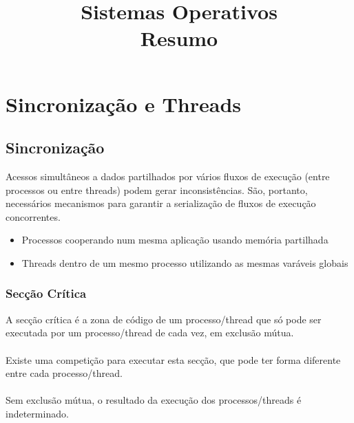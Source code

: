 \documentclass[10pt,a4paper]{report}
\title{\LARGE{Sistemas Operativos} \\ \vspace{0.5cm} \normalsize{Resumo}}
\date{}
\begin{document}
\maketitle
\tableofcontents

\chapter{Sincronização e Threads}
\section{Sincronização}
Acessos simultâneos a dados partilhados por vários fluxos de execução (entre processos ou entre threads) podem gerar
inconsistências. São, portanto, necessários mecanismos para garantir a serialização de fluxos de execução concorrentes.
\begin{itemize}
\item Processos cooperando num mesma aplicação usando memória partilhada
\item Threads dentro de um mesmo processo utilizando as mesmas varáveis globais
\end{itemize}
\subsection{Secção Crítica}
A secção crítica é a zona de código de um processo/thread que só pode ser executada por um processo/thread de cada vez, em exclusão mútua.\\
\\
Existe uma competição para executar esta secção, que pode ter forma diferente entre cada processo/thread.\\
\\
Sem exclusão mútua, o resultado da execução dos processos/threads é indeterminado.
\end{document}
